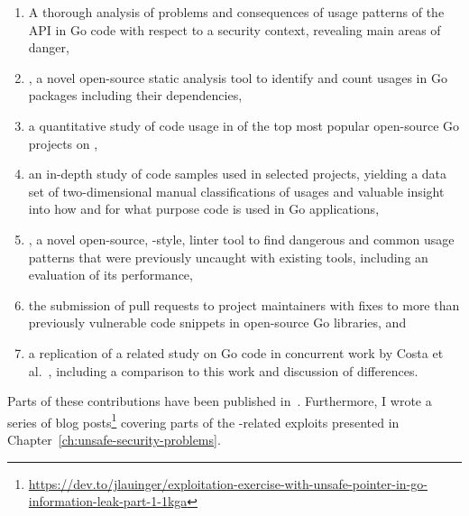 \begin{enumerate}
    \item A thorough analysis of problems and consequences of usage patterns of the \unsafe{} \acrshort{API} in Go code
    with respect to a security context, revealing  main areas of danger,

    \item \toolGeiger, a novel open-source static analysis tool to identify and count \unsafe{} usages in Go packages
    including their dependencies,

    \item a quantitative study of \unsafe{} code usage in \projsAnalyzed{} of the top \projsTotal{} most popular
    open-source Go projects on \github{},

    \item an in-depth study of \numberLabeledCodeSnippets{} code samples used in \projsForLabeledCodeSnippets{} selected
    projects, yielding a data set of two-dimensional manual classifications of usages and valuable insight into how and
    for what purpose \unsafe{} code is used in Go applications,

    \item \toolSafer{}, a novel open-source, \toolVet{}-style, linter tool to find  dangerous and common
    \unsafe{} usage patterns that were previously uncaught with existing tools, including an evaluation of its
    performance,

    \item the submission of \numberPRs{} pull requests to project maintainers with fixes to more than
    \numberBugsFixedRounded{} previously vulnerable code snippets in open-source Go libraries, and

    \item a replication of a related study on \unsafe{} Go code in concurrent work by Costa et al.~\cite{costa2020},
    including a comparison to this work and discussion of differences.
\end{enumerate}

Parts of these contributions have been published in~\cite{lauinger2020}.
Furthermore, I wrote a series of blog
posts\footnote{\url{https://dev.to/jlauinger/exploitation-exercise-with-unsafe-pointer-in-go-information-leak-part-1-1kga}}
covering parts of the \unsafe{}-related exploits presented in
Chapter~\ref{ch:unsafe-security-problems}.



